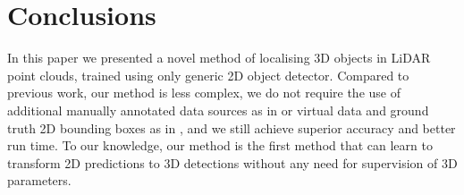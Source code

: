 \section{Conclusions}\label{s:conclusions}

In this paper we presented a novel method of localising 3D objects in LiDAR point clouds, trained using only generic 2D object detector. Compared to previous work, our method is less complex, we do not require the use of additional manually annotated data sources as in \cite{qin20weakly} or virtual data and ground truth 2D bounding boxes as in \cite{zakharov20autolabeling}, and we still achieve superior accuracy and better run time. To our knowledge, our method is the first method that can learn to transform 2D predictions to 3D detections without any need for supervision of 3D parameters.
